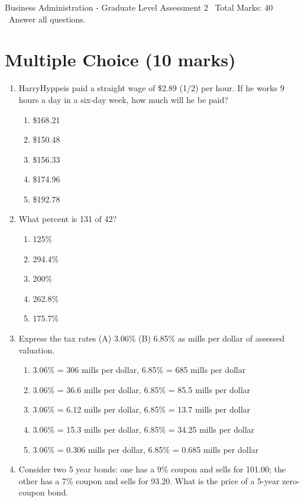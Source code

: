 \documentclass[12pt]{article}
\begin{document}
\begin{center}
Business Administration - Graduate Level Assessment 2 \
Total Marks: 40 \
Answer all questions.
\end{center}

\section*{Multiple Choice (10 marks)}
\begin{enumerate}[label=\arabic*.]
\item HarryHyppeis paid a straight wage of \$2.89 (1/2) per hour. If he works 9 hours a day in a six-day week, how much will he be paid?
\begin{enumerate}[label=(\alph*)]
    \item \$168.21
    \item \$150.48
    \item \$156.33
    \item \$174.96
    \item \$192.78
\end{enumerate}
\item What percent is 131 of 42?
\begin{enumerate}[label=(\alph*)]
    \item 125\%
    \item 294.4\%
    \item 200\%
    \item 262.8\%
    \item 175.7\%
\end{enumerate}
\item Express the tax rates (A) 3.06\% (B) 6.85\% as mills per dollar of assessed valuation.
\begin{enumerate}[label=(\alph*)]
    \item 3.06\% = 306 mills per dollar, 6.85\% = 685 mills per dollar
    \item 3.06\% = 36.6 mills per dollar, 6.85\% = 85.5 mills per dollar
    \item 3.06\% = 6.12 mills per dollar, 6.85\% = 13.7 mills per dollar
    \item 3.06\% = 15.3 mills per dollar, 6.85\% = 34.25 mills per dollar
    \item 3.06\% = 0.306 mills per dollar, 6.85\% = 0.685 mills per dollar
\end{enumerate}
\item Consider two 5 year bonds: one has a 9\% coupon and sells for 101.00; the other has a 7\% coupon and sells for 93.20. What is the price of a 5-year zero-coupon bond.

\end{enumerate}
\end{document}
